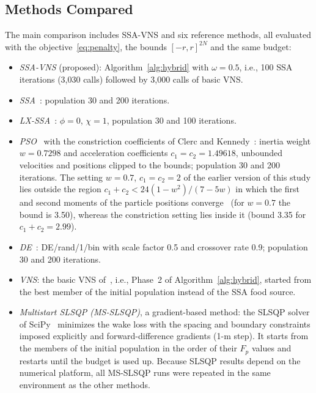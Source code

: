 \documentclass[journal,twoside]{IEEEtran}
\begin{document}
\subsection{Methods Compared}
The main comparison includes SSA-VNS and six reference methods, all evaluated with the objective~\eqref{eq:penalty}, the bounds $[-r,r]^{2N}$ and the same budget:
\begin{itemize}
\item \emph{SSA-VNS} (proposed): Algorithm~\ref{alg:hybrid} with $\omega=0.5$, i.e., 100 SSA iterations (3,030 calls) followed by 3,000 calls of basic VNS.
\item \emph{SSA}~\cite{Mirjalili2017}: population 30 and 200 iterations.
\item \emph{LX-SSA}~\cite{Solanki2023}: $\phi=0$, $\chi=1$, population 30 and 100 iterations.
\item \emph{PSO}~\cite{Kennedy1995} with the constriction coefficients of Clerc and Kennedy~\cite{Clerc2002}: inertia weight $w=0.7298$ and acceleration coefficients $c_1=c_2=1.49618$, unbounded velocities and positions clipped to the bounds; population 30 and 200 iterations. The setting $w=0.7$, $c_1=c_2=2$ of the earlier version of this study lies outside the region $c_1+c_2<24(1-w^2)/(7-5w)$ in which the first and second moments of the particle positions converge~\cite{Poli2009} (for $w=0.7$ the bound is 3.50), whereas the constriction setting lies inside it (bound 3.35 for $c_1+c_2=2.99$).
\item \emph{DE}~\cite{Storn1997}: DE/rand/1/bin with scale factor 0.5 and crossover rate 0.9; population 30 and 200 iterations.
\item \emph{VNS}: the basic VNS of~\cite{Mladenovic1997,Hansen2001,Mladenovic2008}, i.e., Phase~2 of Algorithm~\ref{alg:hybrid}, started from the best member of the initial population instead of the SSA food source.
\item \emph{Multistart SLSQP (MS-SLSQP)}, a gradient-based method: the SLSQP solver of SciPy~\cite{Kraft1988} minimizes the wake loss with the spacing and boundary constraints imposed explicitly and forward-difference gradients (1-m step). It starts from the members of the initial population in the order of their $F_p$ values and restarts until the budget is used up. Because SLSQP results depend on the numerical platform, all MS-SLSQP runs were repeated in the same environment as the other methods.
\end{itemize}
\end{document}
